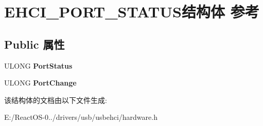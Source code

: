 \hypertarget{struct_e_h_c_i___p_o_r_t___s_t_a_t_u_s}{}\section{E\+H\+C\+I\+\_\+\+P\+O\+R\+T\+\_\+\+S\+T\+A\+T\+U\+S结构体 参考}
\label{struct_e_h_c_i___p_o_r_t___s_t_a_t_u_s}
\subsection*{Public 属性}
\begin{DoxyCompactItemize}
\item 
\mbox{\label{struct_e_h_c_i___p_o_r_t___s_t_a_t_u_s_ab3cbd9d5d75c5b9e7937988768105562}} 
U\+L\+O\+NG {\bfseries Port\+Status}
\item 
\mbox{\label{struct_e_h_c_i___p_o_r_t___s_t_a_t_u_s_ac8bc3318f394df54160ad5469d2aa1f0}} 
U\+L\+O\+NG {\bfseries Port\+Change}
\end{DoxyCompactItemize}


该结构体的文档由以下文件生成\+:\begin{DoxyCompactItemize}
\item 
E\+:/\+React\+O\+S-\/0../drivers/usb/usbehci/hardware.\+h\end{DoxyCompactItemize}
